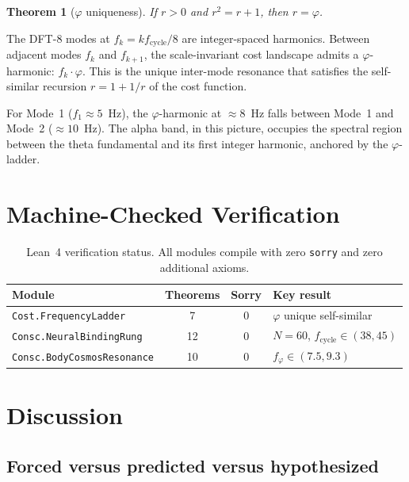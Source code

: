 \documentclass[11pt,a4paper]{article}
\newtheorem{theorem}{Theorem}
\begin{document}
\begin{theorem}[$\varphi$ uniqueness]
If $r > 0$ and $r^2 = r + 1$, then $r = \varphi$.
\end{theorem}

\noindent
The DFT-8 modes at $f_k = k f_{\mathrm{cycle}}/8$ are integer-spaced
harmonics. Between adjacent modes $f_k$ and $f_{k+1}$, the
scale-invariant cost landscape admits a $\varphi$-harmonic:
$f_k \cdot \varphi$. This is the unique inter-mode resonance that
satisfies the self-similar recursion $r = 1 + 1/r$ of the cost
function.

For Mode~1 ($f_1 \approx 5$~Hz), the $\varphi$-harmonic at
$\approx 8$~Hz falls between Mode~1 and Mode~2 ($\approx 10$~Hz).
The alpha band, in this picture, occupies the spectral region between
the theta fundamental and its first integer harmonic, anchored by
the $\varphi$-ladder.

\section{Machine-Checked Verification}
\label{sec:lean}

\begin{table}[H]
\centering
\caption{Lean~4 verification status. All modules compile with
zero \texttt{sorry} and zero additional axioms.}
\label{tab:lean}
\begin{tabular}{@{}lccl@{}}
\toprule
Module & Theorems & Sorry & Key result \\
\midrule
\texttt{Cost.FrequencyLadder}    & 7 & 0 & $\varphi$ unique self-similar \\
\texttt{Consc.NeuralBindingRung} & 12 & 0 & $N{=}60$, $f_{\mathrm{cycle}}{\in}(38,45)$ \\
\texttt{Consc.BodyCosmosResonance} & 10 & 0 & $f_\varphi{\in}(7.5,9.3)$ \\
\bottomrule
\end{tabular}
\end{table}

\section{Discussion}
\label{sec:discussion}

\subsection{Forced versus predicted versus hypothesized}
\end{document}
